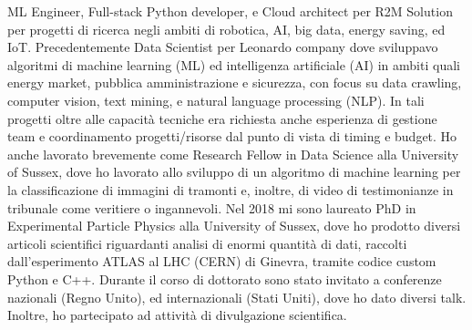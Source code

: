 	
ML Engineer, Full-stack Python developer, e Cloud architect per R2M Solution per progetti di ricerca negli ambiti di robotica, AI, big data, energy saving, ed IoT. 
Precedentemente Data Scientist per Leonardo company dove sviluppavo algoritmi di machine learning (ML) ed intelligenza artificiale (AI) in ambiti quali energy market, pubblica amministrazione e sicurezza, con focus su data crawling, computer vision, text mining, e natural language processing (NLP). In tali progetti oltre alle capacità tecniche era richiesta anche esperienza di gestione team e coordinamento progetti/risorse dal punto di vista di timing e budget. Ho anche lavorato brevemente come Research Fellow in Data Science alla University of Sussex, dove ho lavorato allo sviluppo di un algoritmo di machine learning per la classificazione di immagini di tramonti e, inoltre, di video di testimonianze in tribunale come veritiere o ingannevoli.
Nel 2018 mi sono laureato PhD in Experimental Particle Physics alla University of Sussex, dove ho prodotto diversi articoli scientifici riguardanti analisi di enormi quantità di dati, raccolti dall'esperimento ATLAS al LHC (CERN) di Ginevra, tramite codice custom Python e C++. Durante il corso di dottorato sono stato invitato a conferenze nazionali (Regno Unito), ed internazionali (Stati Uniti), dove ho dato diversi talk. Inoltre, ho partecipato ad attività di divulgazione scientifica.
